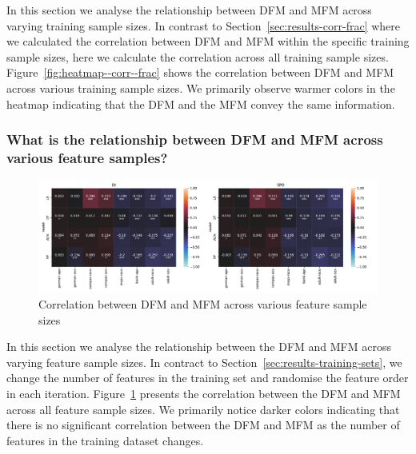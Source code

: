 \documentclass{article}
\begin{document}
In this section we analyse the relationship between DFM and MFM across
varying training sample sizes. In contrast to
Section \ref{sec:results-corr-frac} where we calculated the
correlation between DFM and MFM within the specific training sample
sizes, here we calculate the correlation across all training sample
sizes. Figure \ref{fig:heatmap--corr--frac} shows the correlation
between DFM and MFM across various training sample sizes. We primarily
observe warmer colors in the heatmap indicating that the DFM and the
MFM convey the same information.

\subsubsection{What is the relationship between DFM and MFM across various feature samples?}\label{sec:results-feature-sets}

\begin{figure}
  \centering
  \includegraphics[width=0.95\linewidth]{heatmap--corr--num-features.pdf}
  \caption{Correlation between DFM and MFM across various feature
    sample sizes}
  \label{fig:heatmap--corr--num-features}
\end{figure}

In this section we analyse the relationship between the DFM and MFM
across varying feature sample sizes. In contract to
Section \ref{sec:results-training-sets}, we change the number of
features in the training set and randomise the feature order in each
iteration. Figure \ref{fig:heatmap--corr--num-features} presents the
correlation between the DFM and MFM across all feature sample sizes.
We primarily notice darker colors indicating that there is no
significant correlation between the DFM and MFM as the number of
features in the training dataset changes.
\end{document}
